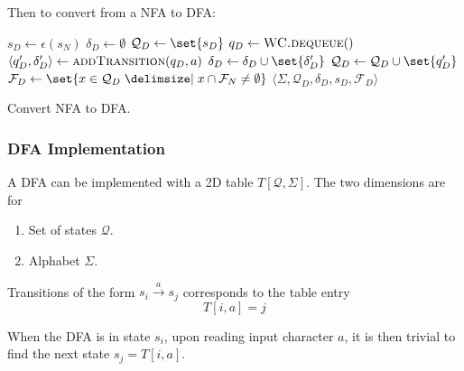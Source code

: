 \begin{definition}
    Then to convert from a NFA to DFA:
    \begin{algorithm}[H]
        \begin{algorithmic}[1]
                \State $s_D \gets \epsilon(s_N)$
                \State $\delta_D \gets \emptyset$
                \State $\mathcal{Q}_D \gets \set{s_D}$
                \State {} 
                    \State $q_D \gets \Call{WC.dequeue}{\null}$
                        \State $\langle q_D^\prime, \delta_D^\prime \rangle \gets \Call{addTransition}{q_D, a}$
                        \State $\delta_D \gets \delta_D \cup \set{\delta_D^\prime}$
                            \State {}
                        \EndIf
                        \State $\mathcal{Q}_D \gets \mathcal{Q}_D \cup \set{q_D^\prime}$
                    \EndFor
                \EndWhile
                \State $\mathcal{F}_D \gets \set{x \in \mathcal{Q}_D \given x \cap \mathcal{F}_N \ne \emptyset}$
                \State \Return $\langle
                    \Sigma,
                    \mathcal{Q}_D,
                    \delta_D,
                    s_D,
                    \mathcal{F}_D
                \rangle$
            \EndProcedure
        \end{algorithmic}
        \caption{Convert NFA to DFA.}
        \label{algo:nfa-to-dfa}
    \end{algorithm}
\end{definition}


\subsubsection{DFA Implementation}

\begin{definition}
    A DFA can be implemented with a 2D table $T[\mathcal{Q}, \Sigma]$. The two dimensions are for
    \begin{enumerate}
        \item Set of states $\mathcal{Q}$.
        \item Alphabet $\Sigma$.
    \end{enumerate}
    
    Transitions of the form $s_i \xrightarrow{a} s_j$ corresponds to the table entry
    \begin{equation}
        T[i, a] = j
    \end{equation}
    
    When the DFA is in state $s_i$, upon reading input character $a$, it is then trivial to find the next state $s_j = T[i, a]$.
\end{definition}

